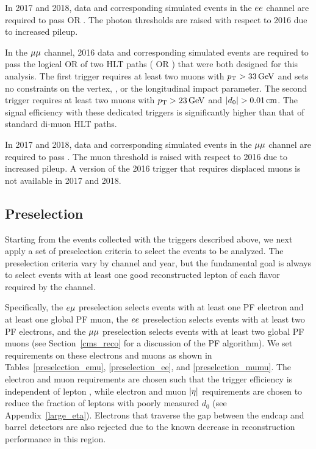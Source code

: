 In 2017 and 2018, data and corresponding simulated events in the $ee$ channel are required to pass  OR  . The photon \ET thresholds are raised with respect to 2016 due to increased pileup.

In the ${\mu}{\mu}$ channel, 2016 data and corresponding simulated events are required to pass the logical OR of two HLT paths ( OR ) that were both designed for this analysis. The first trigger requires at least two muons with $\pt>\SI{33}{\GeV}$ and sets no constraints on the vertex, \ad, or the longitudinal impact parameter. The second trigger requires at least two muons with $\pt>\SI{23}{\GeV}$ and $\ad>\SI{0.01}{\cm}$. The signal efficiency with these dedicated triggers is significantly higher than that of standard di-muon HLT paths.

In 2017 and 2018, data and corresponding simulated events in the ${\mu}{\mu}$ channel are required to pass . The muon \pt threshold is raised with respect to 2016 due to increased pileup. A version of the 2016 trigger that requires displaced muons is not available in 2017 and 2018.

\subsection{Preselection}
\label{preselection}
Starting from the events collected with the triggers described above, we next apply a set of preselection criteria to select the events to be analyzed. The preselection criteria vary by channel and year, but the fundamental goal is always to select events with at least one good reconstructed lepton of each flavor required by the channel. 

Specifically, the $e{\mu}$ preselection selects events with at least one PF electron and at least one global PF muon, the $ee$ preselection selects events with at least two PF electrons, and the ${\mu}{\mu}$ preselection selects events with at least two global PF muons (see Section~\ref{cms_reco} for a discussion of the PF algorithm). We set requirements on these electrons and muons as shown in Tables~\ref{preselection_emu}, \ref{preselection_ee}, and \ref{preselection_mumu}. The electron and muon \pt  requirements are chosen such that the trigger efficiency is independent of lepton \pt, while electron and muon $\lvert \eta \rvert$ requirements are chosen to reduce the fraction of leptons with poorly measured $d_0$ (see Appendix~\ref{large_eta}). Electrons that traverse the gap between the endcap and barrel detectors are also rejected due to the known decrease in reconstruction performance in this region.

